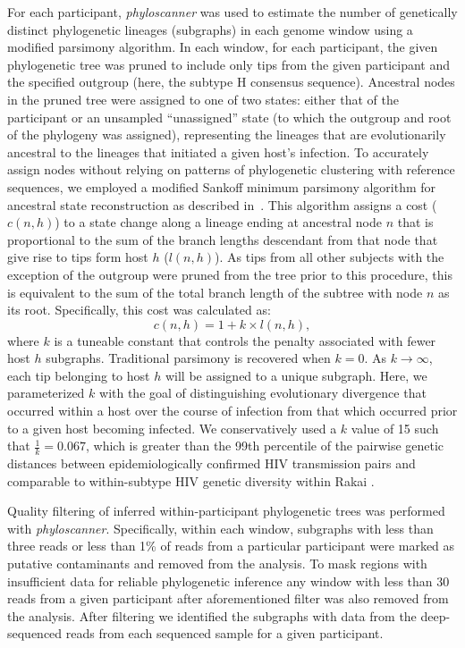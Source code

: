 \documentclass[10pt,letterpaper]{article}
\begin{document}
For each participant, \textit{phyloscanner} was used to estimate the number of genetically distinct phylogenetic lineages (subgraphs) in each genome window using a modified parsimony algorithm. In each window, for each participant, the given phylogenetic tree was pruned to include only tips from the given participant and the specified outgroup (here, the subtype H consensus sequence). Ancestral nodes in the pruned tree were assigned to one of two states: either that of the  participant or an unsampled ``unassigned'' state (to which the outgroup and root of the phylogeny was assigned), representing the lineages that are evolutionarily ancestral to the lineages that initiated a given host's infection. To accurately assign nodes without relying on patterns of phylogenetic clustering with reference sequences, we employed a modified Sankoff minimum parsimony algorithm for ancestral state reconstruction as described in~\cite{sankoff1975,wymant2017}. This algorithm assigns a cost ($c(n,h)$) to a state change along a lineage ending at ancestral node $n$ that is proportional to the sum of the branch lengths descendant from that node that give rise to tips form host $h$ ($l(n,h)$). As tips from all other subjects with the exception of the outgroup were pruned from the tree prior to this procedure, this is equivalent to the sum of the total branch length of the subtree with node $n$ as its root. Specifically, this cost was calculated as: 
\begin{equation}
c(n,h) = 1 + k \times l(n,h),
\end{equation}
where $k$ is a tuneable constant that controls the penalty associated with fewer host $h$ subgraphs. Traditional parsimony is recovered when $k=0$. As $k \to \infty$, each tip belonging to host $h$ will be assigned to a unique subgraph. Here, we parameterized $k$ with the goal of distinguishing evolutionary divergence that occurred within a host over the course of infection from that which occurred prior to a given host becoming infected. We conservatively used a $k$ value of 15 such that $\frac{1}{k} = 0.067$, which is greater than the 99th percentile of the pairwise genetic distances between epidemiologically confirmed HIV transmission pairs \cite{ratmann2019} and comparable to within-subtype HIV genetic diversity within Rakai \cite{kim2024}.  \par

Quality filtering of inferred within-participant phylogenetic trees was performed with \textit{phyloscanner}. Specifically, within each window, subgraphs with less than three reads or less than 1\% of  reads from a particular participant were marked as putative contaminants and removed from the analysis. To mask regions with insufficient data for reliable phylogenetic inference any window with less than 30 reads from a given participant after aforementioned filter was also removed from the analysis. After filtering we identified the subgraphs with data from the deep-sequenced reads from each sequenced sample for a given participant. \par
\end{document}
